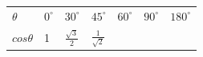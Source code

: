 {{\begin{center}
\begin{xtabular}[t]{|l|l|l|l|l|l|l|}
                  $\theta $
                 &
                  ${0}^{\circ }$
                 &
                  ${30}^{\circ }$
                 &
                  ${45}^{\circ }$
                 &
                  ${60}^{\circ }$
                 &
                  ${90}^{\circ }$
                 &
                  ${180}^{\circ }$
     \tabularnewline{}
                  $cos\theta $
                 &
        1 &
                  $\frac{\sqrt{3}}{2}$
                 &
                  $\frac{1}{\sqrt{2}}$
                 &

\end{xtabular}
\end{center}}}
